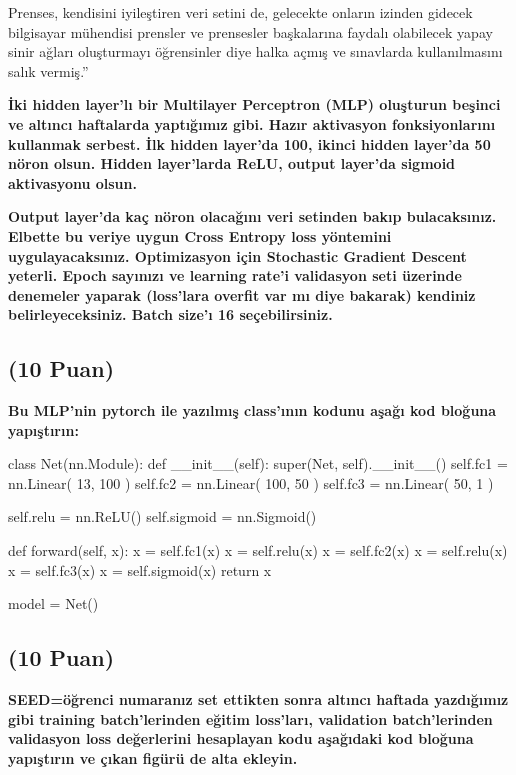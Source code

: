 \documentclass[11pt]{article}
\begin{document}
Prenses, kendisini iyileştiren veri setini de, gelecekte onların izinden gidecek bilgisayar mühendisi prensler ve prensesler başkalarına faydalı olabilecek yapay sinir ağları oluşturmayı öğrensinler diye halka açmış ve sınavlarda kullanılmasını salık vermiş.''

\textbf{İki hidden layer'lı bir Multilayer Perceptron (MLP) oluşturun beşinci ve altıncı haftalarda yaptığımız gibi. Hazır aktivasyon fonksiyonlarını kullanmak serbest. İlk hidden layer'da 100, ikinci hidden layer'da 50 nöron olsun. Hidden layer'larda ReLU, output layer'da sigmoid aktivasyonu olsun.}

\textbf{Output layer'da kaç nöron olacağını veri setinden bakıp bulacaksınız. Elbette bu veriye uygun Cross Entropy loss yöntemini uygulayacaksınız. Optimizasyon için Stochastic Gradient Descent yeterli. Epoch sayınızı ve learning rate'i validasyon seti üzerinde denemeler yaparak (loss'lara overfit var mı diye bakarak) kendiniz belirleyeceksiniz. Batch size'ı 16 seçebilirsiniz.}

\subsection{(10 Puan)} \textbf{Bu MLP'nin pytorch ile yazılmış class'ının kodunu aşağı kod bloğuna yapıştırın:}

\begin{python}
class Net(nn.Module):
    def __init__(self):
        super(Net, self).__init__()
        self.fc1 = nn.Linear( 13, 100 ) 
        self.fc2 = nn.Linear( 100, 50 )
        self.fc3 = nn.Linear( 50, 1 ) 

        self.relu = nn.ReLU()
        self.sigmoid = nn.Sigmoid()

    
    def forward(self, x):
        x = self.fc1(x)
        x = self.relu(x)
        x = self.fc2(x)
        x = self.relu(x)
        x = self.fc3(x)
        x = self.sigmoid(x)
        return x

model = Net()
\end{python}

\subsection{(10 Puan)} \textbf{SEED=öğrenci numaranız set ettikten sonra altıncı haftada yazdığımız gibi training batch'lerinden eğitim loss'ları, validation batch'lerinden validasyon loss değerlerini hesaplayan kodu aşağıdaki kod bloğuna yapıştırın ve çıkan figürü de alta ekleyin.}
\end{document}
